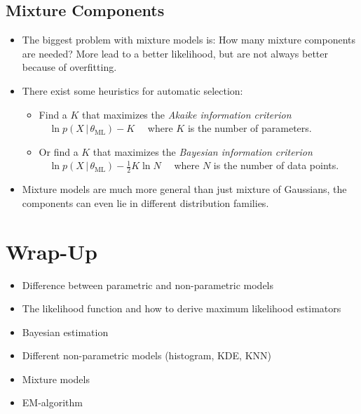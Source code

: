 \documentclass[a4paper, 11pt, accentcolor = tud3b]{tudreport}
\newcommand{\given}{\ensuremath{\,\vert\,}}
\begin{document}
			\subsection{Mixture Components}
				\begin{itemize}
					\item The biggest problem with mixture models is: How many mixture components are needed? More lead to a better likelihood, but are not always better because of overfitting.
					\item There exist some heuristics for automatic selection:
						\begin{itemize}
							\item Find a \(K\) that maximizes the \emph{Akaike information criterion} \( \quad\ln p(X \given \theta_\textrm{ML}) - K\quad \) where \(K\) is the number of parameters.
							\item Or find a \(K\) that maximizes the \emph{Bayesian information criterion} \( \quad\ln p(X \given \theta_\textrm{ML}) - \frac{1}{2} K \ln N\quad \) where \(N\) is the number of data points.
						\end{itemize}
					\item Mixture models are much more general than just mixture of Gaussians, the components can even lie in different distribution families.
				\end{itemize}
		
		\section{Wrap-Up}
			\begin{itemize}
				\item Difference between parametric and non-parametric models
				\item The likelihood function and how to derive maximum likelihood estimators
				\item Bayesian estimation
				\item Different non-parametric models (histogram, KDE, KNN)
				\item Mixture models
				\item EM-algorithm
			\end{itemize}
\end{document}
